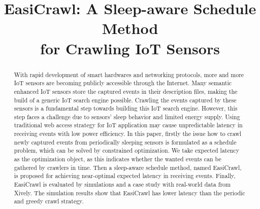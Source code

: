 \documentclass[conference]{IEEEtran}
\begin{document}
\title{EasiCrawl: A Sleep-aware Schedule Method \\for Crawling IoT Sensors}
\author{
}

\maketitle


\begin{abstract}

With rapid development of smart hardwares and networking protocols, more and more IoT sensors are becoming publicly accessible through the Internet.
Many semantic enhanced IoT sensors store the captured events in their description files, making the build of a generic IoT search engine possible.
Crawling the events captured by these sensors is a fundamental step towards building this IoT search engine.
However, this step faces a challenge due to sensors' sleep behavior and limited energy supply.
Using traditional web access strategy for IoT application may cause unpredictable latency in receiving events with low power efficiency.
In this paper, firstly the issue how to crawl newly captured events from periodically sleeping sensors is formulated as a schedule problem, which can be solved by constrained optimization. 
We take expected latency as the optimization object, as this indicates whether the wanted events can be gathered by crawlers in time.
Then a sleep-aware schedule method, named EasiCrawl, is proposed for achieving near-optimal expected latency in receiving events. 
Finally, EasiCrawl is evaluated by simulations and a case study with real-world data from Xively.
The simulation results show that EasiCrawl has lower latency than the periodic and greedy crawl strategy.

\end{abstract}
\end{document}
